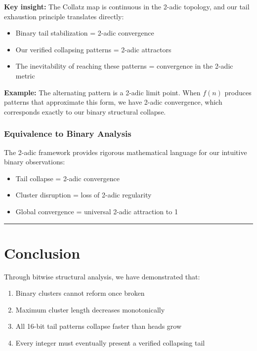 \documentclass[10pt,letterpaper]{article}
\begin{document}
\textbf{Key insight:} The Collatz map is continuous in the 2-adic topology, and our tail exhaustion principle translates directly:

\begin{itemize}
    \item Binary tail stabilization = 2-adic convergence
    \item Our verified collapsing patterns = 2-adic attractors
    \item The inevitability of reaching these patterns = convergence in the 2-adic metric
\end{itemize}

\vspace{1em}

\textbf{Example:} The alternating pattern  is a 2-adic limit point. When $f(n)$ produces patterns that approximate this form, we have 2-adic convergence, which corresponds exactly to our binary structural collapse.

\subsubsection{Equivalence to Binary Analysis}

The 2-adic framework provides rigorous mathematical language for our intuitive binary observations:

\begin{itemize}
    \item Tail collapse = 2-adic convergence
    \item Cluster disruption = loss of 2-adic regularity
    \item Global convergence = universal 2-adic attraction to 1
\end{itemize}

\vspace{1em}
\noindent\rule{\textwidth}{0.4pt}
\vspace{1em}

\section{Conclusion}

Through bitwise structural analysis, we have demonstrated that:

\begin{enumerate}
    \item Binary clusters cannot reform once broken
    \item Maximum cluster length decreases monotonically
    \item All 16-bit tail patterns collapse faster than heads grow
    \item Every integer must eventually present a verified collapsing tail
\end{enumerate}
\end{document}
